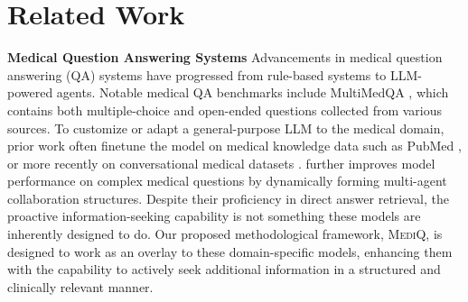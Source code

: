 \documentclass{article}
\begin{document}
\section{Related Work}\vspace{-0.5mm}

\textbf{Medical Question Answering Systems}\hspace{2mm} Advancements in medical question answering (QA) systems have progressed from rule-based systems to LLM-powered agents. Notable medical QA benchmarks include MultiMedQA \citep{singhal2023large}, which contains both multiple-choice and open-ended questions collected from various sources. To customize or adapt a general-purpose LLM to the medical domain, prior work often finetune the model on medical knowledge data such as PubMed \citep{pubmedgpt, Yasunaga2022DeepBL, wu2023pmc, singhal2023large, singhal2023expertlevel}, or more recently on conversational medical datasets \citep{yunxiang2023chatdoctor, han2023medalpaca}. \citet{kim2024mdagentsadaptivecollaborationllms} further improves model performance on complex medical questions by dynamically forming multi-agent collaboration structures. Despite their proficiency in direct answer retrieval, the proactive information-seeking capability is not something these models are inherently designed to do. Our proposed methodological framework, \textsc{MediQ}, is designed to work as an overlay to these domain-specific models, enhancing them with the capability to actively seek additional information in a structured and clinically relevant manner.%
\end{document}
